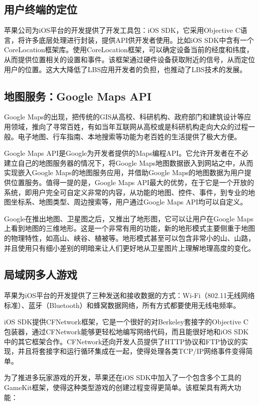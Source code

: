 \documentclass{article}
\begin{document}
\begin{CJK}{UTF8}{gbsn}
	\subsection{用户终端的定位}
  苹果公司为iOS平台的开发提供了开发工具包：iOS SDK，它采用Objective C语言，将许多底层处理进行封装，提供API供开发者使用。比如iOS SDK中含有一个CoreLocation框架库。使用CoreLocation框架，可以确定设备当前的经度和纬度，从而提供位置相关的设置和事件。该框架通过硬件设备获取附近的信号，从而定位用户的位置\cite{iOSLIB}。这大大降低了LBS应用开发者的负担，也推动了LBS技术的发展。

	\subsection{地图服务：Google Maps API}
  Google Maps的出现，把传统的GIS从高校、科研机构、政府部门和建筑设计等应用领域，推向了寻常百姓，有如当年互联网从高校或是科研机构走向大众的过程一般。电子地图、行车指南、本地搜索等功能为老百姓的生活提供了极大方便。

  Google Maps API是Google为开发者提供的Maps编程API。它允许开发者在不必建立自己的地图服务器的情况下，将Google Maps地图数据嵌入到网站之中，从而实现嵌入Google Maps的地图服务应用，并借助Google Maps的地图数据为用户提供位置服务。值得一提的是，Google Maps API最大的优势，在于它是一个开放的系统，即用户完全可自定义非常的内容，从功能的地图、控件、事件，到专业的地图坐标系、地图类型、周边搜索等，用户通过Google Maps API均可以自定义。

  Google在推出地图、卫星图之后，又推出了地形图，它可以让用户在Google Maps上看到地图的三维地形。这是一个非常有用的功能，新的地形模式主要侧重于地图的物理特性，如高山、峡谷、植被等。地形模式甚至可以包含非常小的山、山路，并且使用只有细小差别的明暗来让人们更好地从卫星图片上理解地理高度的变化。\cite{B01}

	\subsection{局域网多人游戏}
  苹果为iOS平台的开发提供了三种发送和接收数据的方式：Wi-Fi（802.11无线网络标准）、蓝牙（Bluetooth）和蜂窝数据网络，所有方式都要使用无线电频率\cite{B02}。

  iOS SDK提供CFNetwork框架，它是一个很好的对Berkeley套接字的Objective C包装器，通过CFNetwork能够更轻松地编写网络代码，而且能很好地和iOS SDK中的其它框架合作。CFNetwork还向开发人员提供了HTTP协议和FTP协议的实现，并且将套接字和运行循环集成在一起，使得处理各类TCP/IP网络事件变得简单。

  为了推进多玩家游戏的开发，苹果还在iOS SDK中加入了一个包含多个工具的GameKit框架，使得这种类型游戏的创建过程变得更简单。该框架具有两大功能：


\end{CJK}
\end{document}
